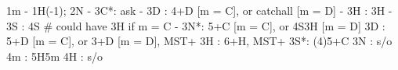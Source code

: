 1m - 1H(-1); 2N -
3C*: ask
   - 3D : 4+D [m = C], or catchall [m = D]
   - 3H : 3H
   - 3S : 4S  # could have 3H if m = C
   - 3N*: 5+C [m = C], or 4S3H [m = D]
3D : 5+D [m = C], or 3+D [m = D], MST+
3H : 6+H, MST+
3S*: (4)5+C
3N : s/o
4m : 5H5m
4H : s/o
